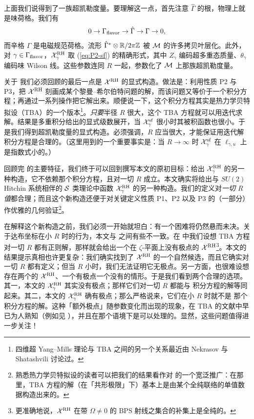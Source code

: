 上面我们说得到了一族超凯勒度量。要理解这一点，首先注意 $\hat \Gamma$ 的根，物理上就是味荷格。我们有
\begin{equation}
0 \rightarrow \Gamma_{\rm flavor} \rightarrow \hat \Gamma \rightarrow \Gamma \rightarrow 0, \label{eq:flavor-seq}
\end{equation}
而辛格 $\Gamma$ 是电磁规范荷格。流形 $\hat \Gamma^*\otimes \mathbb{R}/2\pi \mathbb{Z}$ 被 $\mathcal{M}$ 的许多拷贝叶层化。此外，对 $\gamma \in \Gamma_{\rm flavor}$，$\mathcal{X}^{\rm RH}_{\gamma}$ 取 (\ref{eq:P2-sf}) 的精确形式，其中 $Z_\gamma$ 编码超多重态质量、$\theta_\gamma$ 编码味 Wilson 线。这些参数连同 $R$ 一起，参数化了 $\mathcal{M}$ 上那族超凯勒度量。

关于 \cite{Gaiotto:2008cd} 我们必须回顾的最后一点是 $\mathcal{X}^{\rm RH}$ 的显式构造。做法是：利用性质 P2 与 P3，把 $\mathcal{X}^{\rm RH}$ 刻画成某个黎曼–希尔伯特问题的解，而该问题又等价于一个积分方程；再通过一系列操作把它解出来。顺便说一下，这个积分方程其实是热力学贝特拟设（TBA）的一个版本\footnote{四维超 Yang–Mills 理论与 TBA 之间的另一个关系最近由 Nekrasov 与 Shatashvili 讨论过\cite{Nekrasov:2009ui}。}。\emph{只要}半径 $R$ 很大，这个 TBA 方程就可以用迭代求解。结果是多重积分给出的显式级数展开，当 $\mathcal{X}_{\gamma}^{{\mathrm{sf}}}$ 很小时其被积函数也很小。于是我们得到超凯勒度量的显式构造。必须强调，$R$ 应当很大，才能保证用迭代解积分方程是合理的。（这里用到的一个重要事实是：当 $R\to \infty$ 时 $\mathcal{X}_\gamma^{{\mathrm{sf}}}$ 在 $\ell_{\gamma,u}$ 上是指数式小的。）

回顾完 \cite{Gaiotto:2008cd} 的主要特征，我们终于可以回到撰写本文的原初目标：给出 $\mathcal{X}^{\rm RH}_{\gamma}$ 的另一种构造，它不依赖那个积分方程，且对一切 $R$ 成立。本文确实将给出与 $SU(2)$ Hitchin 系统相伴的 $\mathcal{S}$ 类理论中函数 $\mathcal{X}^{\rm RH}_{\gamma}$ 的另一种构造。我们的定义对\emph{一切 $R$ 值}都合理；而且这个新构造还便于对关键定义性质 P1、P2 以及 P3 的（一部分）作优雅的几何验证\footnote{熟悉热力学贝特拟设的读者可以把我们的结果看作对 \cite{Dorey:1999uk} 的一个宽泛推广：在那里，TBA 方程的解（在「共形极限」下）基本上是由某个全纯联络的单值数据构造出来的。}。

在解释这个新构造之前，我们必须一开始就坦白：有一个困难将仍然悬而未决。关于达布坐标在小 $R$ 时的行为，本文与 \cite{Gaiotto:2008cd} 之间有些不一致。在 \cite{Gaiotto:2008cd} 中我们设想 TBA 方程对一切 $R$ 都有正则解，那样就会给出一个在 $\zeta$-平面上没有极点的 $\mathcal{X}^{\rm RH}$\footnote{更准确地说，$\mathcal{X}^{\rm RH}$ 在带 $\Omega\not=0$ 的 BPS 射线之集合的补集上是全纯的。}。本文的结果提示真相也许更复杂：我们确实找到了 $\mathcal{X}^{\rm RH}$ 的一个自然候选，而且它确实对一切 $R$ 都有定义；但当 $R$ 小时，我们无法证明它无极点。另一方面，也很难设想存在两个的 $\mathcal{X}^{\rm RH}$、一个有极点一个没有的情形。于是我们看到两个合理的选项。其一，本文的 $\mathcal{X}^{\rm RH}_\gamma$ 其实没有极点；那样它们对一切 $R$ 都能与 \cite{Gaiotto:2008cd} 积分方程的解等同起来。其二，本文的 $\mathcal{X}^{\rm RH}_\gamma$ 确有极点；那么严格说来，它们在小 $R$ 时就不是 \cite{Gaiotto:2008cd} 那个积分方程的解。这种「额外极点」随参数变化而出现的现象，在 TBA 的文献中早已为人熟知（例如见 \cite{Dorey:1996re}），并且在那个语境下是可以处理的。显然，这些问题值得进一步关注！

